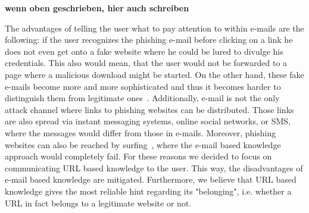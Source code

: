 \begin{description}[leftmargin=0cm]
	\item[Game and Quiz Based Learning as Communication Medium] \textbf{wenn oben geschrieben, hier auch schreiben}		
	\item[URL Based Knowledge as Learning Content] The advantages of telling the user what to pay attention to within e-mails are the following: if the user recognizes the phishing e-mail before clicking on a link he does not even get onto a fake website where he could be lured to divulge his credentials.
 This also would mean, that the user would not be forwarded to a page where a malicious download might be started.
 On the other hand, these fake e-mails become more and more sophisticated and thus it becomes harder to distinguish them from legitimate ones~\cite{microsoftphishing, spamfighter}. Additionally, e-mail is not the only attack channel where links to phishing websites can be distributed.
  Those links are also spread via instant messaging systems, online social networks, or SMS, where the messages would differ from those in e-mails.
 Moreover, phishing websites can also be reached by surfing~\cite{kasperskyreport2013}, where the e-mail based knowledge approach would completely fail.
 For these reasons we decided to focus on communicating URL based knowledge to the user.
 This way, the disadvantages of e-mail based knowledge are mitigated.
 Furthermore, we believe that URL based knowledge gives the most reliable hint regarding its "belonging", i.e. whether a URL in fact belongs to a legitimate website or not.


\end{description}
